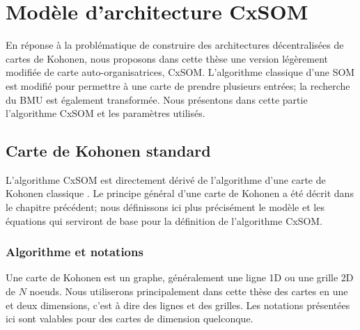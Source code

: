 \chapter{Modèle d'architecture CxSOM}
\graphicspath{{02-SOM/}}
\minitoc

En réponse à la problématique de construire des architectures décentralisées de cartes de Kohonen, nous proposons dans cette thèse une version légèrement modifiée de carte auto-organisatrices, CxSOM. L'algorithme classique d'une SOM est modifié pour permettre à une carte de prendre plusieurs entrées; la recherche du BMU est également transformée.
Nous présentons dans cette partie l'algorithme CxSOM et les paramètres utilisés.

\section{Carte de Kohonen standard}\label{sec:kohonen}
L'algorithme CxSOM est directement dérivé de l'algorithme d'une carte de Kohonen classique \cite{kohonen92}. Le principe général d'une carte de Kohonen a été décrit dans le chapitre précédent; nous définissons ici plus précisément le modèle et les équations qui serviront de base pour la définition de l'algorithme CxSOM.
\subsection{Algorithme et notations}
Une carte de Kohonen est un graphe, généralement une ligne 1D ou une grille 2D de $N$ noeuds. Nous utiliserons principalement dans cette thèse des cartes en une et deux dimensions, c'est à dire des lignes et des grilles. Les notations présentées ici sont valables pour des cartes de dimension quelconque.

